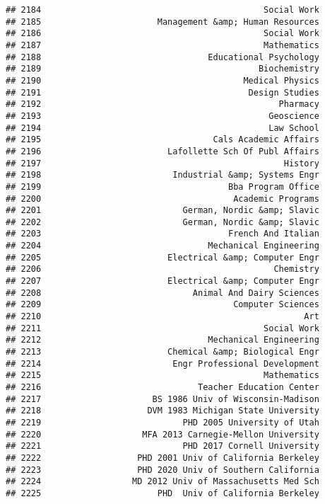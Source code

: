 \documentclass[
]{article}
\begin{document}
\begin{verbatim}
## 2184                                            Social Work
## 2185                       Management &amp; Human Resources
## 2186                                            Social Work
## 2187                                            Mathematics
## 2188                                 Educational Psychology
## 2189                                           Biochemistry
## 2190                                        Medical Physics
## 2191                                         Design Studies
## 2192                                               Pharmacy
## 2193                                             Geoscience
## 2194                                             Law School
## 2195                                  Cals Academic Affairs
## 2196                         Lafollette Sch Of Publ Affairs
## 2197                                                History
## 2198                          Industrial &amp; Systems Engr
## 2199                                     Bba Program Office
## 2200                                      Academic Programs
## 2201                            German, Nordic &amp; Slavic
## 2202                            German, Nordic &amp; Slavic
## 2203                                     French And Italian
## 2204                                 Mechanical Engineering
## 2205                         Electrical &amp; Computer Engr
## 2206                                              Chemistry
## 2207                         Electrical &amp; Computer Engr
## 2208                              Animal And Dairy Sciences
## 2209                                      Computer Sciences
## 2210                                                    Art
## 2211                                            Social Work
## 2212                                 Mechanical Engineering
## 2213                         Chemical &amp; Biological Engr
## 2214                          Engr Professional Development
## 2215                                            Mathematics
## 2216                               Teacher Education Center
## 2217                      BS 1986 Univ of Wisconsin-Madison
## 2218                     DVM 1983 Michigan State University
## 2219                            PHD 2005 University of Utah
## 2220                    MFA 2013 Carnegie-Mellon University
## 2221                            PHD 2017 Cornell University
## 2222                   PHD 2001 Univ of California Berkeley
## 2223                   PHD 2020 Univ of Southern California
## 2224                  MD 2012 Univ of Massachusetts Med Sch
## 2225                       PHD  Univ of California Berkeley

\end{verbatim}
\end{document}
